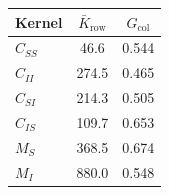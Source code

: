 \begin{tabular}{lcc}
\toprule
Kernel & $\bar{K}_{\text{row}}$ & $G_{\text{col}}$ \\
\midrule
$C_{SS}$ & 46.6 & 0.544 \\
$C_{II}$ & 274.5 & 0.465 \\
$C_{SI}$ & 214.3 & 0.505 \\
$C_{IS}$ & 109.7 & 0.653 \\
$M_S$ & 368.5 & 0.674 \\
$M_I$ & 880.0 & 0.548 \\
\bottomrule
\end{tabular}